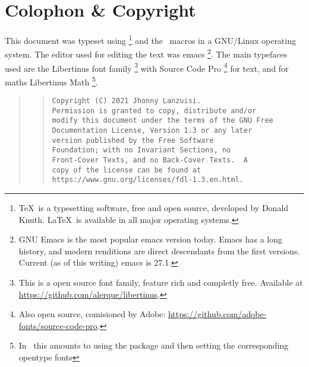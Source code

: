 \newpage
\section*{Colophon \& Copyright}
This document was typeset using \LuaTeX\footnote{\TeX\ is
a typesetting software, free and open source,
developed by Donald Knuth. \LaTeX\ is available in
all major operating systems.}
and the \LaTeXe\ macros in a GNU/Li\-nux operating system.
The editor used for editing the text was emacs%
\footnote{
  \textsc{GNU} Emacs is the most popular emacs version today.
  Emacs has a long history, and modern renditions are direct descendants
  from the first versions.
  Current (as of this writing) emacs is 27.1.
%
}.
The main typefaces used are the Libertinus font family%
\footnote{
  This is a open source font family,
  feature rich and completly free.
  Available at \url{https://github.com/alerque/libertinus}.
}
with Source Code Pro%
\footnote{
  Also open source, comisioned by Adobe:
  \url{https://github.com/adobe-fonts/source-code-pro}.
}
for text, and for maths Libertinus Math%
\footnote{In \LuaLaTeX\ this amounts to using the package
 and then setting the corresponding
opentype fonts}.
\medskip
\begin{quote}\footnotesize
  \begin{quote}
  \begin{verbatim}
Copyright (C) 2021 Jhonny Lanzuisi.
Permission is granted to copy, distribute and/or
modify this document under the terms of the GNU Free
Documentation License, Version 1.3 or any later
version published by the Free Software
Foundation; with no Invariant Sections, no
Front-Cover Texts, and no Back-Cover Texts.  A
copy of the license can be found at
https://www.gnu.org/licenses/fdl-1.3.en.html.
  \end{verbatim}
  \end{quote}
\end{quote}

\newpage
\tableofcontents
